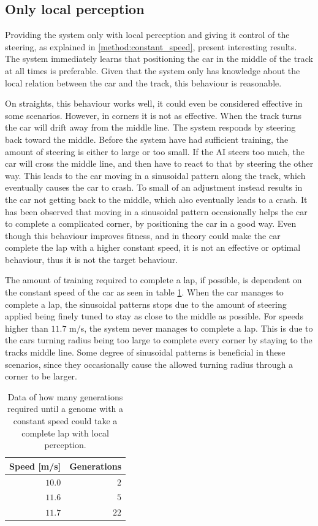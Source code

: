 \subsection{Only local perception}
\label{subsec:local_perception}
Providing the system only with local perception and giving it control of the steering, as explained in \ref{method:constant_speed}, present interesting results. The system immediately learns that positioning the car in the middle of the track at all times is preferable. Given that the system only has knowledge about the local relation between the car and the track, this behaviour is reasonable.

On straights, this behaviour works well, it could even be considered effective in some scenarios. However, in corners it is not as effective. When the track turns the car will drift away from the middle line. The system responds by steering back toward the middle. Before the system have had sufficient training, the amount of steering is either to large or too small. If the AI steers too much, the car will cross the middle line, and then have to react to that by steering the other way. This leads to the car moving in a sinusoidal pattern along the track, which eventually causes the car to crash. To small of an adjustment instead results in the car not getting back to the middle, which also eventually leads to a crash. It has been observed that moving in a sinusoidal pattern occasionally helps the car to complete a complicated corner, by positioning the car in a good way. Even though this behaviour improves fitness, and in theory could make the car complete the lap with a higher constant speed, it is not an effective or optimal behaviour, thus it is not the target behaviour.

The amount of training required to complete a lap, if possible, is dependent on the constant speed of the car as seen in table \ref{tab:localdata}. When the car manages to complete a lap, the sinusoidal patterns stops due to the amount of steering applied being finely tuned to stay as close to the middle as possible. For speeds higher than $11.7$ m/s, the system never manages to complete a lap. This is due to the cars turning radius being too large to complete every corner by staying to the tracks middle line. Some degree of sinusoidal patterns is beneficial in these scenarios, since they occasionally cause the allowed turning radius through a corner to be larger.

\begin{table}[h!] 
  \centering
  \begin{tabular}{rr}
    \toprule
    Speed [m/s] & Generations\\
    \midrule
    $10.0$ & $2$ \\
    $11.6$ & $5$ \\
    $11.7$ & $22$ \\
    \bottomrule
  \end{tabular}
  \caption{Data of how many generations required until a genome with a constant speed could take a complete lap with local perception.}
  \label{tab:localdata}
\end{table}

